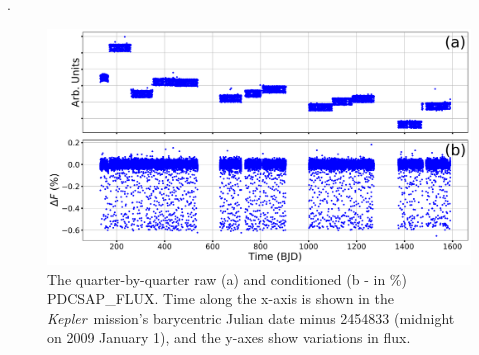 \documentclass[manuscript]{aastex62}
\newcommand{\kepler}{{\it Kepler}}
\begin{document}


\acknowledgments



.




\begin{figure}
\includegraphics[width=\textwidth]{raw-conditioned-data_Analysis_of_Kepler76b.png}
\caption{The quarter-by-quarter raw (a) and conditioned (b - in \%) PDCSAP\_FLUX. Time along the x-axis is shown in the \kepler\ mission's barycentric Julian date minus 2454833 (midnight on 2009 January 1), and the y-axes show variations in flux.\label{fig:raw-conditioned-data_Analysis_of_Kepler76b}}
\end{figure}
\end{document}
